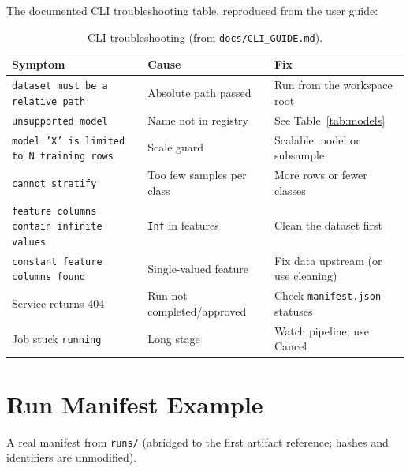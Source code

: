 The documented CLI troubleshooting table, reproduced from the user guide:

\begin{table}[H]
\centering
\caption{CLI troubleshooting (from \texttt{docs/CLI\_GUIDE.md}).}
\small
\begin{tabular}{p{5.4cm}p{4.6cm}p{4.4cm}}
\toprule
\textbf{Symptom} & \textbf{Cause} & \textbf{Fix} \\
\midrule
\texttt{dataset must be a relative path} & Absolute path passed & Run from the workspace root \\
\texttt{unsupported model} & Name not in registry & See Table~\ref{tab:models} \\
\texttt{model 'X' is limited to N training rows} & Scale guard & Scalable model or subsample \\
\texttt{cannot stratify} & Too few samples per class & More rows or fewer classes \\
\texttt{feature columns contain infinite values} & \texttt{Inf} in features & Clean the dataset first \\
\texttt{constant feature columns found} & Single-valued feature & Fix data upstream (or use cleaning) \\
Service returns 404 & Run not completed/approved & Check \texttt{manifest.json} statuses \\
Job stuck \texttt{running} & Long stage & Watch pipeline; use Cancel \\
\bottomrule
\end{tabular}
\end{table}

\chapter{Run Manifest Example}
\label{anx:manifest}

A real manifest from \texttt{runs/} (abridged to the first artifact reference; hashes and identifiers are unmodified).

